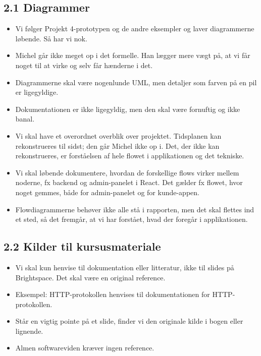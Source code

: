 \documentclass[a4paper,11pt]{article}
\begin{document}
\subsection*{2.1 Diagrammer}

\begin{itemize}
    \item Vi følger Projekt 4-prototypen og de andre eksempler og laver diagrammerne løbende. Så har vi nok.
    \item Michel går ikke meget op i det formelle. Han lægger mere vægt på, at vi får noget til at virke og selv får hænderne i det.
    \item Diagrammerne skal være nogenlunde UML, men detaljer som farven på en pil er ligegyldige.
    \item Dokumentationen er ikke ligegyldig, men den skal være fornuftig og ikke banal.
    \item Vi skal have et overordnet overblik over projektet. Tidsplanen kan rekonstrueres til sidst; den går Michel ikke op i. Det, der ikke kan rekonstrueres, er forståelsen af hele flowet i applikationen og det tekniske.
    \item Vi skal løbende dokumentere, hvordan de forskellige flows virker mellem noderne, fx backend og admin-panelet i React. Det gælder fx flowet, hvor noget gemmes, både for admin-panelet og for kunde-appen.
    \item Flowdiagrammerne behøver ikke alle stå i rapporten, men det skal flettes ind et sted, så det fremgår, at vi har forstået, hvad der foregår i applikationen.
\end{itemize}

\subsection*{2.2 Kilder til kursusmateriale}

\begin{itemize}
    \item Vi skal kun henvise til dokumentation eller litteratur, ikke til slides på Brightspace. Det skal være en original reference.
    \item Eksempel: HTTP-protokollen henvises til dokumentationen for HTTP-protokollen.
    \item Står en vigtig pointe på et slide, finder vi den originale kilde i bogen eller lignende.
    \item Almen softwareviden kræver ingen reference.
\end{itemize}
\end{document}
